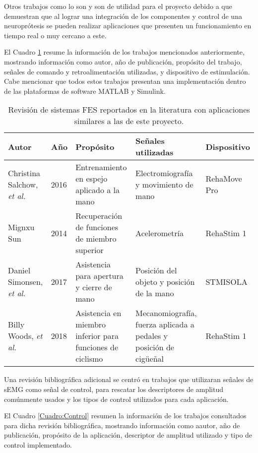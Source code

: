 Otros trabajos como lo son \cite{Simonsen2017} y \cite{Woods2018} son de utilidad para el proyecto debido a que demuestran que al lograr una integración de los componentes y control de una neuroprótesis se pueden realizar aplicaciones que presenten un funcionamiento en tiempo real o muy cercano a este.

El Cuadro \ref{Cuadro:Sistemas FES} resume la información de los trabajos mencionados anteriormente, mostrando información como autor, año de publicación, propósito del trabajo, señales de comando y retroalimentación utilizadas, y dispositivo de estimulación. Cabe mencionar que todos estos trabajos presentan una implementación dentro de las plataformas de software MATLAB y Simulink.

\begin{table}[hbt]
	\centering
	\begin{tabular}{|p{30mm}|p{10mm}|p{40mm}|p{40mm}|p{25mm}|}
	\hline
	\textbf{Autor} & \textbf{Año} & \textbf{Propósito} & \textbf{Señales utilizadas} & \textbf{Dispositivo}\\ 
	\hline
	\hline
	Christina Salchow, \emph{et al.} \cite{Salchow2016} & 2016 & Entrenamiento en espejo aplicado a la mano & Electromiografía y movimiento de mano & RehaMove Pro\\
	\hline
	Mignxu Sun \cite{Sun2014} & 2014 & Recuperación de funciones de miembro superior & Acelerometría & RehaStim 1\\
	\hline
	Daniel Simonsen, \emph{et al.} \cite{Simonsen2017} & 2017 & Asistencia para apertura y cierre de mano & Posición del objeto y posición de la mano & STMISOLA\\
	\hline
	Billy Woods, \emph{et al.} \cite{Woods2018} & 2018 & Asistencia en miembro inferior para funciones de ciclismo & Mecanomiografía, fuerza aplicada a pedales y posición de cigüeñal & RehaStim 1\\
	\hline
	\end{tabular}
	\caption{Revisión de sistemas FES reportados en la literatura con aplicaciones similares a las de este proyecto.}
	\label{Cuadro:Sistemas FES}
\end{table}

Una revisión bibliográfica adicional se centró en trabajos que utilizaran señales de sEMG como señal de control, para rescatar los descriptores de amplitud comúnmente usados y los tipos de control utilizados para cada aplicación.

El Cuadro \ref{Cuadro:Control} resumen la información de los trabajos consultados para dicha revisión bibliográfica, mostrando información como aautor, año de publicación, propósito de la aplicación, descriptor de amplitud utilizado y tipo de control implementado.

